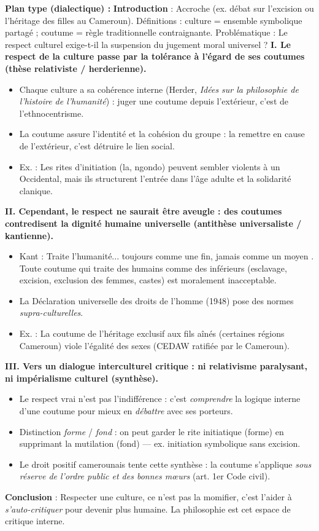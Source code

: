 \documentclass[11pt]{article}
\begin{document}
\begin{corrige}[Exercice n°1]
\textbf{Plan type (dialectique) :}
\textbf{Introduction} : Accroche (ex. débat sur l'excision ou l'héritage des filles au Cameroun). Définitions : culture = ensemble symbolique partagé ; coutume = règle traditionnelle contraignante. Problématique : Le respect culturel exige-t-il la suspension du jugement moral universel ?
\textbf{I. Le respect de la culture passe par la tolérance à l'égard de ses coutumes (thèse relativiste / herderienne).}
\begin{itemize}
    \item Chaque culture a sa cohérence interne (Herder, \emph{Idées sur la philosophie de l'histoire de l'humanité}) : juger une coutume depuis l'extérieur, c'est de l'ethnocentrisme.
    \item La coutume assure l'identité et la cohésion du groupe : la remettre en cause de l'extérieur, c'est détruire le lien social.
    \item Ex. : Les rites d'initiation (la, ngondo) peuvent sembler violents à un Occidental, mais ils structurent l'entrée dans l'âge adulte et la solidarité clanique.
\end{itemize}
\textbf{II. Cependant, le respect ne saurait être aveugle : des coutumes contredisent la dignité humaine universelle (antithèse universaliste / kantienne).}
\begin{itemize}
    \item Kant : \guillemotleft Traite l'humanité... toujours comme une fin, jamais comme un moyen \guillemotright. Toute coutume qui traite des humains comme des inférieurs (esclavage, excision, exclusion des femmes, castes) est moralement inacceptable.
    \item La Déclaration universelle des droits de l'homme (1948) pose des normes \emph{supra-culturelles}.
    \item Ex. : La coutume de l'héritage exclusif aux fils aînés (certaines régions Cameroun) viole l'égalité des sexes (CEDAW ratifiée par le Cameroun).
\end{itemize}
\textbf{III. Vers un dialogue interculturel critique : ni relativisme paralysant, ni impérialisme culturel (synthèse).}
\begin{itemize}
    \item Le respect vrai n'est pas l'indifférence : c'est \emph{comprendre} la logique interne d'une coutume pour mieux en \emph{débattre} avec ses porteurs.
    \item Distinction \emph{forme} / \emph{fond} : on peut garder le rite initiatique (forme) en supprimant la mutilation (fond) — ex. initiation symbolique sans excision.
    \item Le droit positif camerounais tente cette synthèse : la coutume s'applique \emph{sous réserve de l'ordre public et des bonnes mœurs} (art. 1er Code civil).
\end{itemize}
\textbf{Conclusion} : Respecter une culture, ce n'est pas la momifier, c'est l'aider à \emph{s'auto-critiquer} pour devenir plus humaine. La philosophie est cet espace de critique interne.
\end{corrige}
\end{document}
